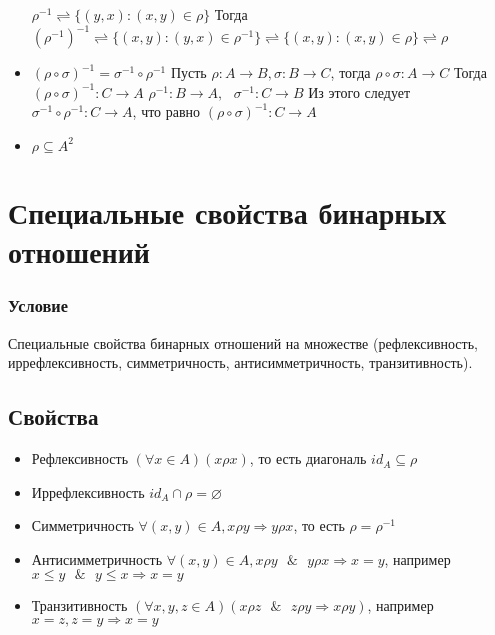 \documentclass{report}
\newcommand{\band}{\mbox{ } \& \mbox{ }}
\begin{document}
\begin{itemize}
          $\rho^{-1} \rightleftharpoons \{(y,x): (x,y) \in \rho\}$\newline
          Тогда $(\rho^{-1})^{-1} \rightleftharpoons
              \{(x,y): (y,x) \in \rho^{-1}\} \rightleftharpoons
              \{(x,y): (x,y) \in \rho\} \rightleftharpoons \rho$
    \item $(\rho \circ \sigma)^{-1} = \sigma^{-1} \circ \rho^{-1}$\newline
          Пусть $\rho: A \rightarrow B, \sigma: B \rightarrow C$, тогда $\rho \circ \sigma: A \rightarrow C$\newline
          Тогда $(\rho \circ \sigma)^{-1}: C \rightarrow A$\newline
          $\rho^{-1}: B \rightarrow A,\mbox{ } \sigma^{-1}: C \rightarrow B$\newline
          Из этого следует $\sigma^{-1} \circ \rho^{-1}: C \rightarrow A$, что равно $(\rho \circ \sigma)^{-1}:C \rightarrow A$
    \item $\rho \subseteq A^{2}$



\end{itemize}
\newpage
\section{Специальные свойства бинарных отношений}
\subsubsection{Условие}
Специальные свойства бинарных отношений на множестве (рефлексивность,
иррефлексивность, симметричность, антисимметричность, транзитивность).

\subsection{Свойства}
\begin{itemize}
    \item Рефлексивность\newline
          $(\forall x \in A)(x\rho x)$, то есть диагональ $id_A \subseteq \rho$
    \item Иррефлексивность\newline
          $id_A \cap \rho = \varnothing$
    \item Симметричность\newline
          $\forall (x,y) \in A, x\rho y \Rightarrow y\rho x$, то есть $\rho = \rho^{-1}$
    \item  Антисимметричность\newline
          $\forall (x,y) \in A, x\rho y \band y\rho x \Rightarrow x = y$, например $x \leq y \band y \leq x \Rightarrow x = y$
    \item Транзитивность\newline
          $(\forall x,y,z \in A)(x\rho z \band z\rho y \Rightarrow x\rho y)$, например $x = z, z = y \Rightarrow x = y$
\end{itemize}
\newpage
\end{document}

